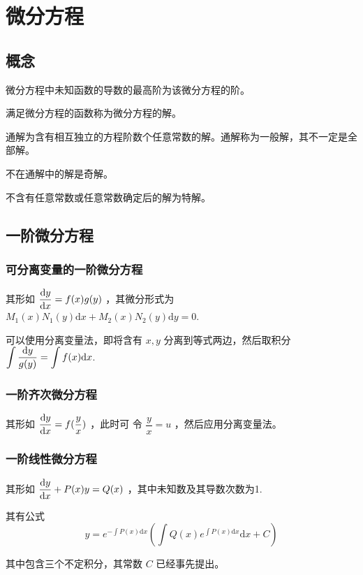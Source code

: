 \chapter{微分方程}

\section{概念}

微分方程中未知函数的导数的最高阶为该微分方程的阶。

满足微分方程的函数称为微分方程的解。

通解为含有相互独立的方程阶数个任意常数的解。通解称为一般解，其不一定是全部解。

不在通解中的解是奇解。

不含有任意常数或任意常数确定后的解为特解。

\section{一阶微分方程}

\subsection{可分离变量的一阶微分方程}

其形如 $ \displaystyle \dfrac{\mathrm{d} y}{\mathrm{d}x} = f(x)g(y) $ ，其微分形式为
$ M_1(x)N_1(y)\mathrm{d}x+M_2(x)N_2(y)\mathrm{d}y = 0 $.

可以使用分离变量法，即将含有 $ x,y $ 分离到等式两边，然后取积分 
$ \displaystyle \int \dfrac{\mathrm{d}y}{g(y)} = \int f(x)\mathrm{d}x $.

\subsection{一阶齐次微分方程}

其形如 $ \displaystyle \dfrac{\mathrm{d}y}{\mathrm{d}x}=f(\dfrac{y}{x}) $ ，此时可
令 $ \dfrac{y}{x} = u $ ，然后应用分离变量法。

\subsection{一阶线性微分方程}

其形如 $ \displaystyle \dfrac{\mathrm{d}y}{\mathrm{d}x} + P(x)y = Q(x) $ ，其中未知数及其导数次数为1.

其有公式$$
    y = e^{-\int P(x)\mathrm{d}x}
    \left(\int Q(x)e^{\int P(x)\mathrm{d}x}\mathrm{d}x+C\right)
$$ 

其中包含三个不定积分，其常数 $ C $ 已经事先提出。

